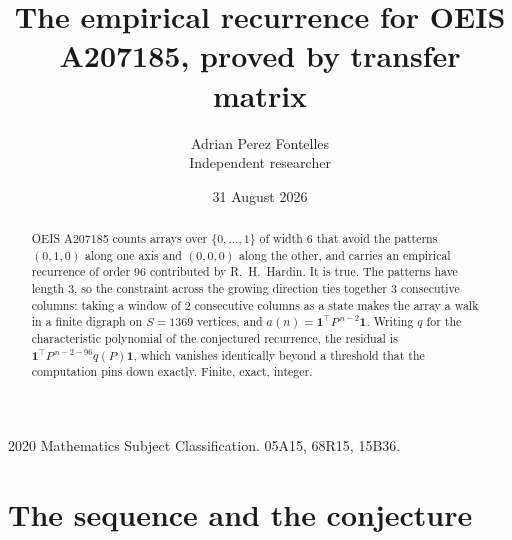 \documentclass[11pt,a4paper]{article}
\title{The empirical recurrence for OEIS A207185, proved by transfer matrix}
\author{Adrian Perez Fontelles\\ \small Independent researcher}
\date{31 August 2026}
\theoremstyle{plain}
\theoremstyle{definition}
\begin{document}
\maketitle

\begin{abstract}
OEIS A207185 counts arrays over $\{0,\dots,1\}$ of width $6$ that avoid the patterns
$(0,1,0)$ along one axis and $(0,0,0)$ along the other, and carries an empirical recurrence of
order $96$ contributed by R.~H.~Hardin. It is true. The patterns have length $3$, so
the constraint across the growing direction ties together $3$ consecutive columns: taking a
window of $2$ consecutive columns as a state makes the array a walk in a finite digraph
on $S=1369$ vertices, and $a(n)=\mathbf{1}^{\!\top}P^{\,n-2}\mathbf{1}$. Writing $q$
for the characteristic polynomial of the conjectured recurrence, the residual is
$\mathbf{1}^{\!\top}P^{\,n-2-96}q(P)\mathbf{1}$, which vanishes identically
beyond a threshold that the computation pins down exactly. Finite, exact, integer.
\end{abstract}

\noindent\small 2020 Mathematics Subject Classification. 05A15, 68R15, 15B36.\normalsize

\section{The sequence and the conjecture}
\end{document}
